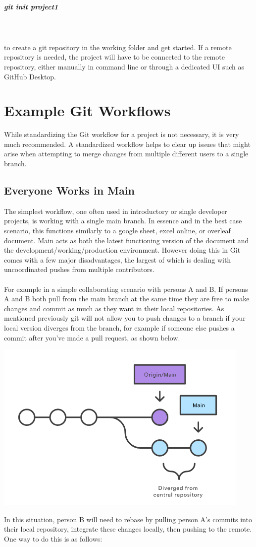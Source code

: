 \documentclass{article}
\begin{document}
\subparagraph{git init project1} \mbox{}\\ \\

to create a git repository in the working folder and get started. If a remote repository is needed, the project will have to be connected to the remote repository, either manually in command line or through a dedicated UI such as GitHub Desktop. 

\section{Example Git Workflows}
While standardizing the Git workflow for a project is not necessary, it is very much recommended. A standardized workflow helps to clear up issues that might arise when attempting to merge changes from multiple different users to a single branch.
\subsection{Everyone Works in Main}
The simplest workflow, one often used in introductory or single developer projects, is working with a single main branch. In essence and in the best case scenario, this functions similarly to a google sheet, excel online, or overleaf document. Main acts as both the latest functioning version of the document and the development/working/production environment. However doing this in Git comes with a few major disadvantages, the largest of which is dealing with uncoordinated pushes from multiple contributors.
\paragraph{}
For example in a simple collaborating scenario with persons A and B, If persons A and B both pull from the main branch at the same time they are free to make changes and commit as much as they want in their local repositories. 
\label{workflows} As mentioned previously git will not allow you to push changes to a branch if your local version diverges from the branch, for example if someone else pushes a commit after you've made a pull request, as shown below. 
\begin{center}
\includegraphics[width=.7\textwidth]{diverge}
\end{center}
In this situation, person B will need to rebase by pulling person A's commits into their local repository, integrate these changes locally, then pushing to the remote. One way to do this is as follows:
\end{document}
